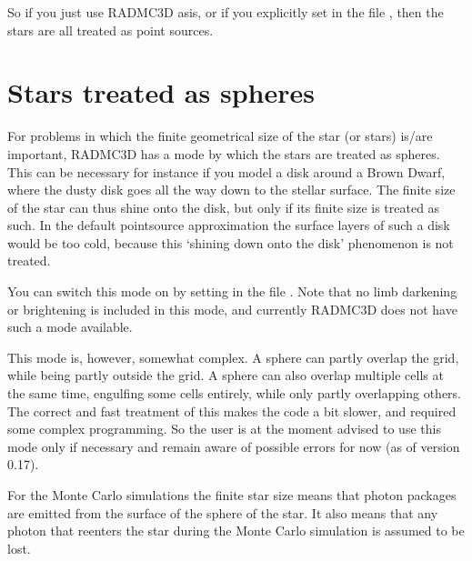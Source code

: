 \documentclass[letterpaper,10pt,english]{sphinxmanual}
\begin{document}
So if you just use RADMC\sphinxhyphen{}3D as\sphinxhyphen{}is, or if you explicitly set 
in the file , then the stars are all treated as point sources.


\section{Stars treated as spheres}
\label{\detokenize{stars:stars-treated-as-spheres}}\label{\detokenize{stars:sec-stars-as-spheres}}
For problems in which the finite geometrical size of the star (or stars)
is/are important, RADMC\sphinxhyphen{}3D has a mode by which the stars are treated as
spheres. This can be necessary for instance if you model a disk around
a Brown Dwarf, where the dusty disk goes all the way down to the stellar
surface. The finite size of the star can thus shine  onto the
disk, but only if its finite size is treated as such. In the default
point\sphinxhyphen{}source approximation the surface layers of such a disk would be
too cold, because this ‘shining down onto the disk’ phenomenon is
not treated.

You can switch this mode on by setting  in the
file . Note that no limb darkening or brightening is
included in this mode, and currently RADMC\sphinxhyphen{}3D does not have such a mode
available.

This mode is, however, somewhat complex. A sphere can partly overlap the
grid, while being partly outside the grid. A sphere can also overlap
multiple cells at the same time, engulfing some cells entirely, while only
partly overlapping others. The correct and fast treatment of this makes
the code a bit slower, and required some complex programming. So the user
is at the moment advised to use this mode only if necessary and remain
aware of possible errors for now (as of version 0.17).

For the Monte Carlo simulations the finite star size means that photon
packages are emitted from the surface of the sphere of the star. It also
means that any photon that re\sphinxhyphen{}enters the star during the Monte Carlo
simulation is assumed to be lost.
\end{document}

